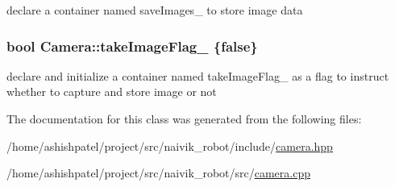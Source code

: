 declare a container named save\+Images\+\_\+ to store image data 

\subsubsection[{\texorpdfstring{take\+Image\+Flag\+\_\+}{takeImageFlag_}}]{\setlength{\rightskip}{0pt plus 5cm}bool Camera\+::take\+Image\+Flag\+\_\+ \{false\}\hspace{0.3cm}{\ttfamily [private]}}\hypertarget{classCamera_af0d737a2c07092eafccd2e8c6c124e0b}{}\label{classCamera_af0d737a2c07092eafccd2e8c6c124e0b}


declare and initialize a container named take\+Image\+Flag\+\_\+ as a flag to instruct whether to capture and store image or not 



The documentation for this class was generated from the following files\+:\begin{DoxyCompactItemize}
\item 
/home/ashishpatel/project/src/naivik\+\_\+robot/include/\hyperlink{camera_8hpp}{camera.\+hpp}\item 
/home/ashishpatel/project/src/naivik\+\_\+robot/src/\hyperlink{camera_8cpp}{camera.\+cpp}\end{DoxyCompactItemize}
